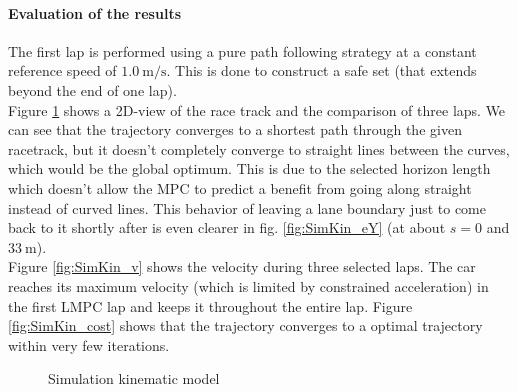 \paragraph{Evaluation of the results}
The first lap is performed using a pure path following strategy at a constant reference speed of $\SI{1.0}{\meter\per\second}$. This is done to construct a safe set (that extends beyond the end of one lap).\\
Figure \ref{fig:SimKin_xy} shows a 2D-view of the race track and the comparison of three laps. We can see that the trajectory converges to a shortest path through the given racetrack, but it doesn't completely converge to straight lines between the curves, which would be the global optimum. This is due to the selected horizon length which doesn't allow the MPC to predict a benefit from going along straight instead of curved lines. This behavior of leaving a lane boundary just to come back to it shortly after is even clearer in fig. \ref{fig:SimKin_eY} (at about $s=0$ and $\SI{33}{\meter}$).\\
Figure \ref{fig:SimKin_v} shows the velocity during three selected laps. The car reaches its maximum velocity (which is limited by constrained acceleration) in the first LMPC lap and keeps it throughout the entire lap. Figure \ref{fig:SimKin_cost} shows that the trajectory converges to a optimal trajectory within very few iterations.
\begin{figure}[ht]
	\centering
  	
	\caption{Simulation kinematic model}
	\label{fig:SimKin_xy}
\end{figure}

